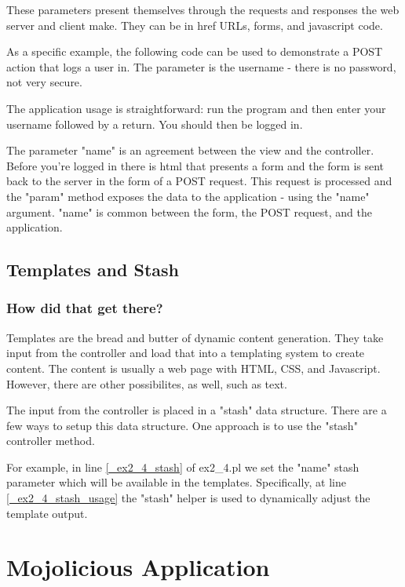 \documentclass[14pt]{extreport}
\newcommand\Small{\fontsize{10}{10.2}\selectfont}
\newcommand*\LSTfont{\Small\ttfamily\SetTracking{encoding=*}{-60}\lsstyle}
\begin{document}
These parameters present themselves through the requests and
responses the web server and client make.  They can be in href URLs, forms, and
javascript code.

As a specific example, the following code can be used to
demonstrate a POST action that logs a user in.  The parameter is the username -
there is no password, not very secure.



The application usage is straightforward: run the program and then enter your
username followed by a return.  You should then be logged in.

The parameter "name" is an agreement between the view and the controller.
Before you're logged in there is html that presents a form and the form is sent
back to the server in the form of a POST request.  This request is processed
and the "param" method exposes the data to the application - using the "name"
argument.  "name" is common between the form, the POST request, and the
application.

\section{Templates and Stash}

\subsection{How did that get there?}

Templates are the bread and butter of dynamic content generation.  They take
input from the controller and load that into a templating system to create
content.  The content is usually a web page with HTML, CSS, and Javascript.
However, there are other possibilites, as well, such as text.

The input from the controller is placed in a "stash" data structure.  There are
a few ways to setup this data structure.  One approach is to use the "stash"
controller method.



For example, in line \ref{_ex2_4_stash} of ex2\_4.pl we set the "name" stash 
parameter which will be available in the templates.  Specifically, at line 
\ref{_ex2_4_stash_usage} the "stash" helper is used to dynamically adjust
the template output.

\chapter*{Mojolicious Application}
\end{document}
